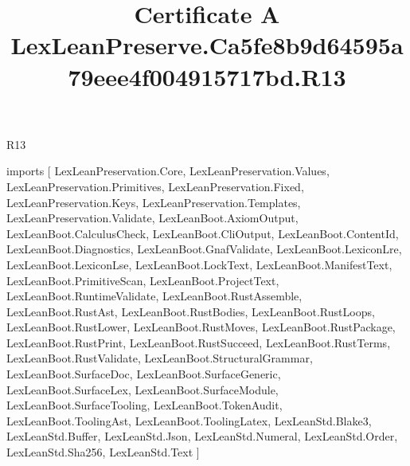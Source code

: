 \begin{lexlean}{R13}
\title{Certificate A LexLeanPreserve.Ca5fe8b9d64595a79eee4f004915717bd.R13}
\begin{coremodule}
imports [
  LexLeanPreservation.Core,
  LexLeanPreservation.Values,
  LexLeanPreservation.Primitives,
  LexLeanPreservation.Fixed,
  LexLeanPreservation.Keys,
  LexLeanPreservation.Templates,
  LexLeanPreservation.Validate,
  LexLeanBoot.AxiomOutput,
  LexLeanBoot.CalculusCheck,
  LexLeanBoot.CliOutput,
  LexLeanBoot.ContentId,
  LexLeanBoot.Diagnostics,
  LexLeanBoot.GnafValidate,
  LexLeanBoot.LexiconLre,
  LexLeanBoot.LexiconLse,
  LexLeanBoot.LockText,
  LexLeanBoot.ManifestText,
  LexLeanBoot.PrimitiveScan,
  LexLeanBoot.ProjectText,
  LexLeanBoot.RuntimeValidate,
  LexLeanBoot.RustAssemble,
  LexLeanBoot.RustAst,
  LexLeanBoot.RustBodies,
  LexLeanBoot.RustLoops,
  LexLeanBoot.RustLower,
  LexLeanBoot.RustMoves,
  LexLeanBoot.RustPackage,
  LexLeanBoot.RustPrint,
  LexLeanBoot.RustSucceed,
  LexLeanBoot.RustTerms,
  LexLeanBoot.RustValidate,
  LexLeanBoot.StructuralGrammar,
  LexLeanBoot.SurfaceDoc,
  LexLeanBoot.SurfaceGeneric,
  LexLeanBoot.SurfaceLex,
  LexLeanBoot.SurfaceModule,
  LexLeanBoot.SurfaceTooling,
  LexLeanBoot.TokenAudit,
  LexLeanBoot.ToolingAst,
  LexLeanBoot.ToolingLatex,
  LexLeanStd.Blake3,
  LexLeanStd.Buffer,
  LexLeanStd.Json,
  LexLeanStd.Numeral,
  LexLeanStd.Order,
  LexLeanStd.Sha256,
  LexLeanStd.Text
]


\end{coremodule}
\end{lexlean}
